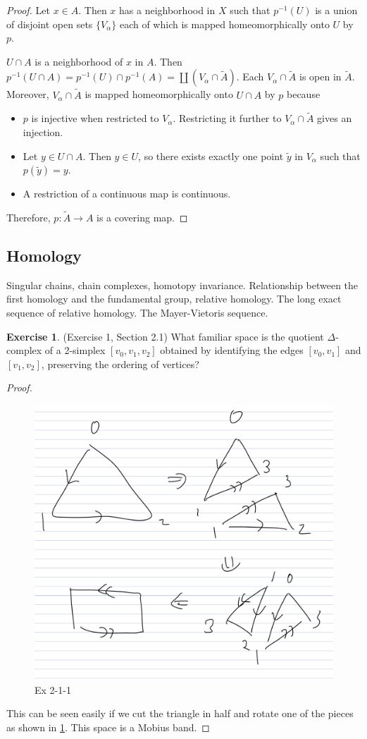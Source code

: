 \documentclass[12pt, psamsfonts]{amsart}
\theoremstyle{definition}
\newtheorem*{exer}{Exercise}
\theoremstyle{remark}
\numberwithin{equation}{section}
\begin{document}
\begin{proof}
  Let $x \in A$.
  Then $x$ has a neighborhood in $X$ such that $p^{-1}(U)$ is a union of disjoint open sets $\{ V_{\alpha} \}$ each of which is mapped homeomorphically onto $U$ by $p$.

  $U \cap A$ is a neighborhood of $x$ in $A$.
  Then $p^{-1}(U \cap A) = p^{-1}(U) \cap p^{-1}(A) = \coprod (V_{\alpha} \cap \tilde{A})$.
  Each $V_{\alpha} \cap \tilde{A}$ is open in $\tilde{A}$.
  Moreover, $V_{\alpha} \cap \tilde{A}$ is mapped homeomorphically onto $U \cap A$ by $p$ because
  \begin{itemize}
    \item
      $p$ is injective when restricted to $V_{\alpha}$.
      Restricting it further to $V_{\alpha} \cap \tilde{A}$ gives an injection.
    \item
      Let $y \in U \cap A$.
      Then $y \in U$, so there exists exactly one point $\tilde{y}$ in $V_{\alpha}$ such that $p(\tilde{y}) = y$.
    \item
      A restriction of a continuous map is continuous.
  \end{itemize}
  Therefore, $p:\tilde{A} \rightarrow A$ is a covering map.
\end{proof}

\subsection{Homology}
Singular chains, chain complexes, homotopy invariance.
Relationship between the first homology and the fundamental group, relative homology.
The long exact sequence of relative homology.
The Mayer-Vietoris sequence.

\begin{exer}{(Exercise 1, Section 2.1)}
  What familiar space is the quotient $\Delta$-complex of a 2-simplex $[v_0, v_1, v_2]$ obtained by identifying the edges $[v_0, v_1]$ and $[v_1, v_2]$, preserving the ordering of vertices?
\end{exer}

\begin{proof}
  \begin{figure}[!htb]
    \includegraphics[width=.5\linewidth]{img/hatcher/ex-2-1-1.jpeg}
    \caption{Ex 2-1-1}
    \label{fig:ex_2_1_1}
  \end{figure}

  This can be seen easily if we cut the triangle in half and rotate one of the pieces as shown in \ref{fig:ex_2_1_1}.
  This space is a Mobius band.
\end{proof}
\end{document}
